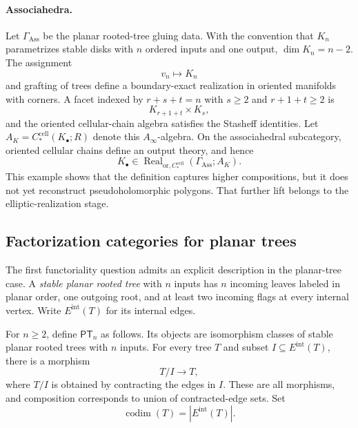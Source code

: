 \documentclass[11pt,letterpaper,twoside]{article}
\theoremstyle{plain}
\theoremstyle{definition}
\theoremstyle{remark}
\newcommand{\Ainf}{A_\infty}
\newcommand{\Real}{\operatorname{Real}}
\begin{document}
\paragraph{Associahedra.}
Let \(\Gamma_{\mathrm{Ass}}\) be the planar rooted-tree gluing data.  With the convention that \(K_n\) parametrizes stable disks with \(n\) ordered inputs and one output, \(\dim K_n=n-2\).  The assignment
\[
 v_n\longmapsto K_n
\]
and grafting of trees define a boundary-exact realization in oriented manifolds with corners.  A facet indexed by \(r+s+t=n\) with \(s\geq2\) and \(r+1+t\geq2\) is
\[
 K_{r+1+t}\times K_s,
\]
and the oriented cellular-chain algebra satisfies the Stasheff identities.  Let
\(
A_K=C_*^{\mathrm{cell}}(K_\bullet;R)
\)
denote this \(\Ainf\)-algebra.  On the associahedral subcategory, oriented cellular chains define an output theory, and hence
\[
 K_\bullet\in
 \Real_{\mathrm{or},C_*^{\mathrm{cell}}}
 (\Gamma_{\mathrm{Ass}};A_K).
\]
This example shows that the definition captures higher compositions, but it does not yet reconstruct pseudoholomorphic polygons.  That further lift belongs to the elliptic-realization stage.

\subsection{Factorization categories for planar trees}

The first functoriality question admits an explicit description in the planar-tree case.  A \emph{stable planar rooted tree} with \(n\) inputs has \(n\) incoming leaves labeled in planar order, one outgoing root, and at least two incoming flags at every internal vertex.  Write \(E^{\mathrm{int}}(T)\) for its internal edges.

For \(n\geq 2\), define \(\mathsf{PT}_n\) as follows.  Its objects are isomorphism classes of stable planar rooted trees with \(n\) inputs.  For every tree \(T\) and subset \(I\subseteq E^{\mathrm{int}}(T)\), there is a morphism
\begin{equation}\label{eq:tree-arrow}
 T/I\longrightarrow T,
\end{equation}
where \(T/I\) is obtained by contracting the edges in \(I\).  These are all morphisms, and composition corresponds to union of contracted-edge sets.  Set
\[
 \operatorname{codim}(T)=|E^{\mathrm{int}}(T)|.
\]
\end{document}
